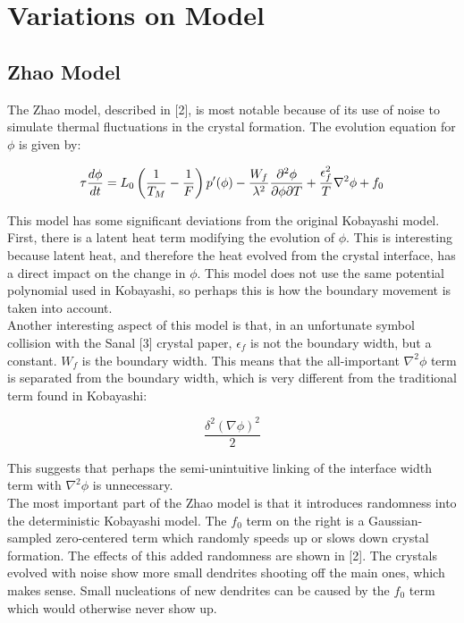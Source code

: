 \documentclass[10pt]{article} %
\begin{document}
\section{Variations on Model}
\subsection{Zhao Model}
The Zhao model, described in [2], is most notable because of its use of noise to simulate thermal fluctuations in the crystal formation. The evolution equation for $\phi$ is given by:

\begin{equation}
  \tau \frac{d\phi}{dt} = L_0\left(\frac{1}{T_M} - \frac{1}{F}\right)p'(\phi) - \frac{W_f}{\lambda^2}\frac{\partial^2\phi}{\partial\phi\partial T} + \frac{\epsilon_f^2}{T}\nabla^2\phi + f_0\\
\end{equation}

This model has some significant deviations from the original Kobayashi model. First, there is a latent heat term modifying the evolution of $\phi$. This is interesting because latent heat, and therefore the heat evolved from the crystal interface, has a direct impact on the change in $\phi$. This model does not use the same potential polynomial used in Kobayashi, so perhaps this is how the boundary movement is taken into account.\\

Another interesting aspect of this model is that, in an unfortunate symbol collision with the Sanal [3] crystal paper, $\epsilon_f$ is not the boundary width, but a constant. $W_f$ is the boundary width. This means that the all-important $\nabla^2\phi$ term is separated from the boundary width, which is very different from the traditional term found in Kobayashi:

\begin{equation}
  \frac{\delta^2(\nabla\phi)^2}{2}
\end{equation}

This suggests that perhaps the semi-unintuitive linking of the interface width term with $\nabla^2\phi$ is unnecessary.\\

The most important part of the Zhao model is that it introduces randomness into the deterministic Kobayashi model. The $f_0$ term on the right is a Gaussian-sampled zero-centered term which randomly speeds up or slows down crystal formation. The effects of this added randomness are shown in [2]. The crystals evolved with noise show more small dendrites shooting off the main ones, which makes sense. Small nucleations of new dendrites can be caused by the $f_0$ term which would otherwise never show up.\\
\end{document}
